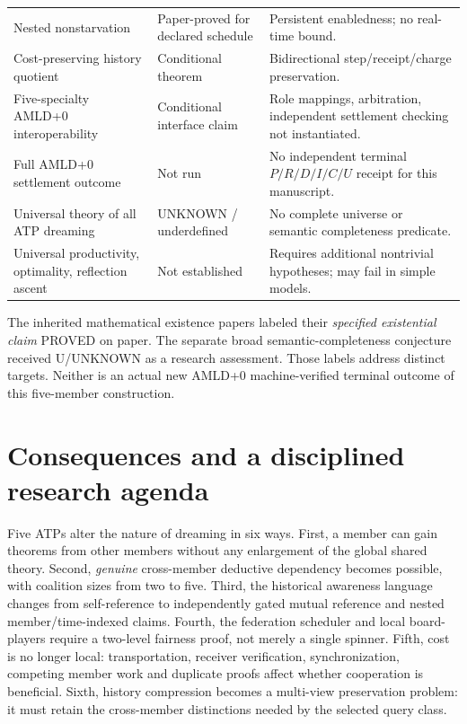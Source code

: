 \documentclass[11pt]{article}
\begin{document}
\begin{longtable}{p{.25\linewidth}p{.18\linewidth}p{.49\linewidth}}
Nested nonstarvation & Paper-proved for declared schedule & Persistent enabledness; no real-time bound.\\
Cost-preserving history quotient & Conditional theorem & Bidirectional step/receipt/charge preservation.\\
Five-specialty AMLD+0 interoperability & Conditional interface claim & Role mappings, arbitration, independent settlement checking not instantiated.\\
Full AMLD+0 settlement outcome & Not run & No independent terminal $P/R/D/I/C/U$ receipt for this manuscript.\\
Universal theory of all ATP dreaming & UNKNOWN / underdefined & No complete universe or semantic completeness predicate.\\
Universal productivity, optimality, reflection ascent & Not established & Requires additional nontrivial hypotheses; may fail in simple models.\\\bottomrule
\end{longtable}
The inherited mathematical existence papers labeled their \emph{specified existential claim} PROVED on paper. The separate broad semantic-completeness conjecture received U/UNKNOWN as a research assessment. Those labels address distinct targets. Neither is an actual new AMLD+0 machine-verified terminal outcome of this five-member construction.

\section{Consequences and a disciplined research agenda}
Five ATPs alter the nature of dreaming in six ways. First, a member can gain theorems from other members without any enlargement of the global shared theory. Second, \emph{genuine} cross-member deductive dependency becomes possible, with coalition sizes from two to five. Third, the historical awareness language changes from self-reference to independently gated mutual reference and nested member/time-indexed claims. Fourth, the federation scheduler and local board-players require a two-level fairness proof, not merely a single spinner. Fifth, cost is no longer local: transportation, receiver verification, synchronization, competing member work and duplicate proofs affect whether cooperation is beneficial. Sixth, history compression becomes a multi-view preservation problem: it must retain the cross-member distinctions needed by the selected query class.
\end{document}
